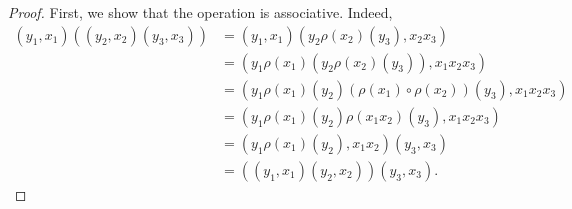 \documentclass[12pt]{report}
\numberwithin{equation}{section}
\numberwithin{theorem}{chapter}
\theoremstyle{definition}
\newtheorem*{basic properties}{Basic Properties}
\newtheorem*{Important Remark}{Important Remark}
\begin{document}
\begin{proof} 
First, we show that the operation is associative. Indeed,
$$\begin{aligned}
(y_1,x_1) \left( (y_2, x_2) (y_3, x_3) \right)
& = (y_1,x_1) (y_2\rho(x_2)(y_3), x_2x_3) \\
& = (y_1\rho(x_1)\left(y_2\rho(x_2)(y_3)\right), x_1x_2x_3)\\
& = (y_1\rho(x_1)(y_2)(\rho(x_1)\circ \rho(x_2))(y_3), x_1x_2x_3)\\
& = (y_1\rho(x_1)(y_2)\rho(x_1x_2)(y_3), x_1x_2x_3)\\
& = (y_1 \rho(x_1)(y_2), x_1 x_2)  (y_3, x_3) \\
& = \left( (y_1,x_1) (y_2, x_2) \right) (y_3, x_3).
\end{aligned}$$


\end{proof}
\end{document}
